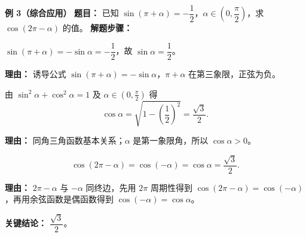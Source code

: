 \begin{examplebox}
\medskip
\textbf{\textcolor{CExample}{例 3（综合应用）}}
\textbf{\textcolor{CExample}{题目：}} 已知 $\sin(\pi+\alpha)=-\dfrac12$，$\alpha\in(0,\dfrac{\pi}{2})$，求 $\cos(2\pi-\alpha)$ 的值。
\textbf{\textcolor{CExample}{解题步骤：}}
\begin{description}[style=nextline, leftmargin=2.8em, labelsep=0.5em, itemsep=0.45em]
    \item[\textbf{第一步（由已知求 $\sin\alpha$）：}] $\sin(\pi+\alpha)=-\sin\alpha=-\dfrac12$，故 $\sin\alpha=\dfrac12$。
    \par\textbf{理由：} 诱导公式 $\sin(\pi+\alpha)=-\sin\alpha$，$\pi+\alpha$ 在第三象限，正弦为负。
    \item[\textbf{第二步（求 $\cos\alpha$）：}] 由 $\sin^2\alpha+
    \cos^2\alpha=1$ 及 $\alpha\in(0,\frac{\pi}{2})$ 得
    \[
    \cos\alpha=\sqrt{1-\left(\frac12\right)^2}=\dfrac{\sqrt3}{2}.
    \]
    \par\textbf{理由：} 同角三角函数基本关系；$\alpha$ 是第一象限角，所以 $\cos\alpha>0$。
    \item[\textbf{第三步（求目标）：}] 
    \[
    \cos(2\pi-\alpha)=\cos(-\alpha)=\cos\alpha=\dfrac{\sqrt3}{2}.
    \]
    \par\textbf{理由：} $2\pi-\alpha$ 与 $-\alpha$ 同终边，先用 $2\pi$ 周期性得到 $\cos(2\pi-\alpha)=\cos(-\alpha)$，再用余弦函数是偶函数得到 $\cos(-\alpha)=\cos\alpha$。
\end{description}
\textbf{\textcolor{CExample}{关键结论：}} \textbf{$\dfrac{\sqrt3}{2}$}。
\end{examplebox}
